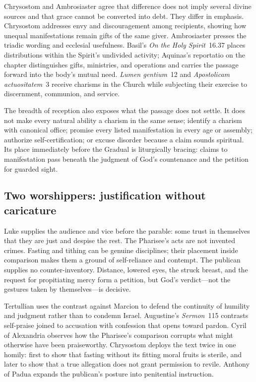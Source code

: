 Chrysostom and Ambrosiaster agree that difference does not imply several
divine sources and that grace cannot be converted into debt. They differ in
emphasis. Chrysostom addresses envy and discouragement among recipients,
showing how unequal manifestations remain gifts of the same giver.
Ambrosiaster presses the triadic wording and ecclesial usefulness. Basil's
\emph{On the Holy Spirit}~16.37 places distributions within the Spirit's
undivided activity; Aquinas's reportatio on the chapter distinguishes gifts,
ministries, and operations and carries the passage forward into the body's
mutual need. \emph{Lumen gentium}~12 and \emph{Apostolicam
actuositatem}~3 receive charisms in the Church while subjecting their exercise
to discernment, communion, and service.

The breadth of reception also exposes what the passage does not settle. It
does not make every natural ability a charism in the same sense; identify a
charism with canonical office; promise every listed manifestation in every
age or assembly; authorize self-certification; or excuse disorder because a
claim sounds spiritual. Its place immediately before the Gradual is
liturgically bracing: claims to manifestation pass beneath the judgment of
God's countenance and the petition for guarded sight.

\subsection*{Two worshippers: justification without caricature\enspace{}}

Luke supplies the audience and vice before the parable: some trust in
themselves that they are just and despise the rest. The Pharisee's acts are
not invented crimes. Fasting and tithing can be genuine disciplines; their
placement inside comparison makes them a ground of self-reliance and
contempt. The publican supplies no counter-inventory. Distance, lowered eyes,
the struck breast, and the request for propitiating mercy form a petition, but
God's verdict---not the gestures taken by themselves---is decisive.

Tertullian uses the contrast against Marcion to defend the continuity of
humility and judgment rather than to condemn Israel. Augustine's
\emph{Sermon}~115 contrasts self-praise joined to accusation with confession
that opens toward pardon. Cyril of Alexandria observes how the Pharisee's
comparison corrupts what might otherwise have been praiseworthy. Chrysostom
deploys the text twice in one homily: first to show that fasting without its
fitting moral fruits is sterile, and later to show that a true allegation does
not grant permission to revile. Anthony of Padua expands the publican's
posture into penitential instruction.

